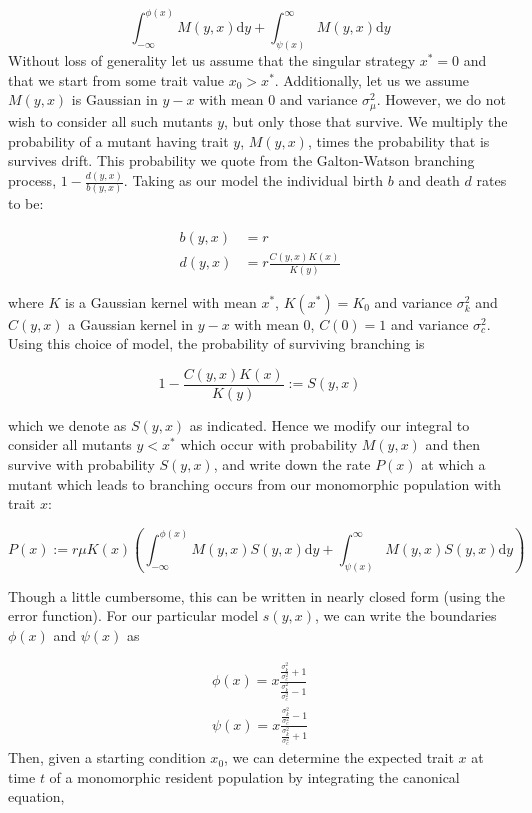 \documentclass[letterpaper,10pt]{article}
\newcommand{\ud}{\mathrm{d}}
\begin{document}
\begin{equation*}
\int_{-\infty}^{\phi(x)} M(y,x) \ud y + \int_{\psi(x)}^{\infty} M(y,x) \ud y 
\end{equation*}
Without loss of generality let us assume that the singular strategy $x^* = 0$ and that we start from some trait value $x_0 > x^*$.  Additionally, let us we assume $M(y,x)$ is Gaussian in $y-x$ with mean 0 and variance $\sigma_{\mu}^2$. However, we do not wish to consider all such mutants $y$, but only those that survive.  We multiply the probability of a mutant having trait $y$, $M(y,x)$, times the probability that is survives drift.  This probability we quote from the Galton-Watson branching process, $1-\tfrac{d(y,x)}{b(y,x)}$.  Taking as our model the individual birth $b$ and death $d$ rates to be:

\begin{align}
b(y,x) &= r\\
d(y,x) &= r\frac{C(y,x)K(x)}{K(y)}
\end{align}

where $K$ is a Gaussian kernel with mean $x^*$, $K(x^*) = K_0$ and variance $\sigma^2_k$ and $C(y,x)$ a Gaussian kernel in $y-x$ with mean $0$, $C(0) =1$ and variance $\sigma^2_c$. Using this choice of model, the probability of surviving branching is

\begin{equation}
1-\frac{C(y,x)K(x)}{K(y)} := S(y,x)
\label{S}
\end{equation}

which we denote as $S(y,x)$ as indicated. Hence we modify our integral to consider all mutants $y < x^*$ which occur with probability $M(y,x)$ and then survive with probability $S(y,x)$, and write down the rate $P(x)$ at which a mutant which leads to branching occurs from our monomorphic population with trait $x$:

\begin{equation}
P(x) := r \mu K(x)\left( \int_{-\infty}^{\phi(x)} M(y,x) S(y,x) \ud y + \int_{\psi(x)}^{\infty} M(y,x) S(y,x) \ud y  \right)
\label{MSerf}
\end{equation}

Though a little cumbersome, this can be written in nearly closed form (using the error function). For our particular model $s(y,x)$, we can write the boundaries $\phi(x)$ and $\psi(x)$ as 

\begin{align}
\phi(x) = x\frac{\frac{\sigma_k^2}{\sigma_c^2}+1}{\frac{\sigma_k^2}{\sigma_c^2}-1} \nonumber \\
\psi(x) = x\frac{\frac{\sigma_k^2}{\sigma_c^2}-1}{\frac{\sigma_k^2}{\sigma_c^2}+1}
\label{phipsi}
\end{align}
Then, given a starting condition $x_0$, we can determine the expected trait $x$ at time $t$ of a monomorphic resident population by integrating the canonical equation,
\end{document}

